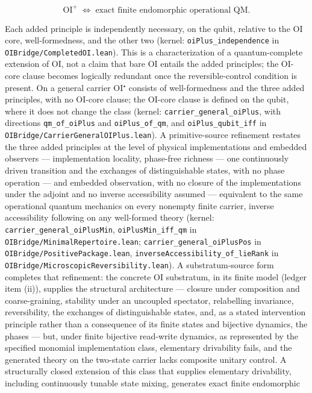 \documentclass[
]{article}
\begin{document}
\[\mathrm{OI}^{+}\;\iff\;\text{exact finite endomorphic operational QM}.\]

Each added principle is independently necessary, on the qubit, relative
to the OI core, well-formedness, and the other two (kernel:
\texttt{oiPlus\_independence} in \texttt{OIBridge/CompletedOI.lean}).
This is a characterization of a quantum-complete extension of OI, not a
claim that bare OI entails the added principles; the OI-core clause
becomes logically redundant once the reversible-control condition is
present. On a general carrier OI⁺ consists of well-formedness and the
three added principles, with no OI-core clause; the OI-core clause is
defined on the qubit, where it does not change the class (kernel:
\texttt{carrier\_general\_oiPlus}, with directions
\texttt{qm\_of\_oiPlus} and \texttt{oiPlus\_of\_qm}, and
\texttt{oiPlus\_qubit\_iff} in
\texttt{OIBridge/CarrierGeneralOIPlus.lean}). A primitive-source
refinement restates the three added principles at the level of physical
implementations and embedded observers --- implementation locality,
phase-free richness --- one continuously driven transition and the
exchanges of distinguishable states, with no phase operation --- and
embedded observation, with no closure of the implementations under the
adjoint and no inverse accessibility assumed --- equivalent to the same
operational quantum mechanics on every nonempty finite carrier, inverse
accessibility following on any well-formed theory (kernel:
\texttt{carrier\_general\_oiPlusMin}, \texttt{oiPlusMin\_iff\_qm} in
\texttt{OIBridge/MinimalRepertoire.lean};
\texttt{carrier\_general\_oiPlusPos} in
\texttt{OIBridge/PositivePackage.lean},
\texttt{inverseAccessibility\_of\_lieRank} in
\texttt{OIBridge/MicroscopicReversibility.lean}). A substratum-source
form completes that refinement: the concrete OI substratum, in its
finite model (ledger item (ii)), supplies the structural architecture
--- closure under composition and coarse-graining, stability under an
uncoupled spectator, relabelling invariance, reversibility, the
exchanges of distinguishable states, and, as a stated intervention
principle rather than a consequence of its finite states and bijective
dynamics, the phases --- but, under finite bijective read-write
dynamics, as represented by the specified monomial implementation class,
elementary drivability fails, and the generated theory on the two-state
carrier lacks composite unitary control. A structurally closed extension
of this class that supplies elementary drivability, including
continuously tunable state mixing, generates exact finite endomorphic
\end{document}
